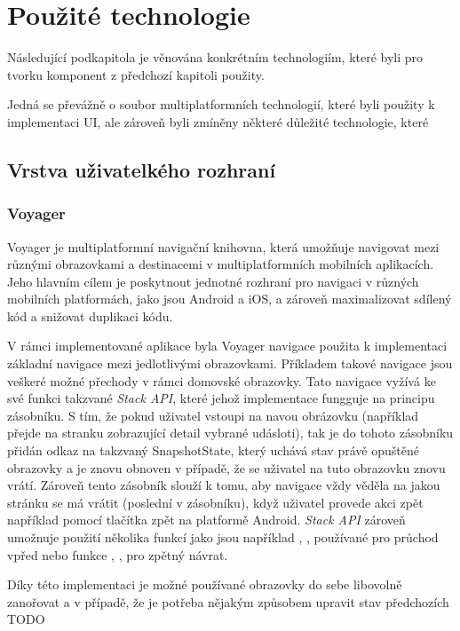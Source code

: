 \section{Použité technologie}
Následující podkapitola je věnována konkrétním technologiím, které byli pro tvorku komponent z předchozí kapitoli použity.

Jedná se převážně o soubor multiplatformních technologií, které byli použity k implementaci UI, ale zároveň byli zmíněny některé důležité technologie,
které


\subsection{Vrstva uživatelkého rozhraní}

\subsubsection*{Voyager}
Voyager je multiplatformní navigační knihovna, která umožňuje navigovat mezi různými obrazovkami a destinacemi v multiplatformních mobilních
 aplikacích. \cite{voyager} Jeho hlavním cílem je poskytnout jednotné rozhraní pro navigaci v různých mobilních platformách, jako jsou Android a iOS, a 
 zároveň maximalizovat sdílený kód a snižovat duplikaci kódu.

 V rámci implementované aplikace byla Voyager navigace použita k implementaci základní navigace mezi jedlotlivými obrazovkami.
 Příkladem takové navigace jsou veškeré možné přechody v rámci domovské obrazovky. Tato navigace vyžívá ke své funkci takzvané 
 \textit{Stack API}, které jehož implementace fungguje na principu zásobníku. S tím, že pokud uživatel vstoupi na navou obrázovku 
 (například přejde na stranku zobrazující detail vybrané udásloti), tak je do tohoto zásobníku přidán odkaz na takzvaný SnapshotState,
 který uchává stav právě opuštěné obrazovky a je znovu obnoven v případě, že se uživatel na tuto obrazovku znovu vrátí. Zároveň tento
 zásobník slouží k tomu, aby navigace vždy věděla na jakou stránku se má vrátit (poslední v zásobníku), když uživatel provede akci zpět
 například pomocí tlačítka zpět na platformě Android. \textit{Stack API} zároveň umožnuje použití několika funkcí jako jsou například 
 , ,  používané pro průchod vpřed nebo funkce , , 
  pro zpětný návrat. 

 Díky této implementaci je možné používané obrazovky do sebe libovolně zanořovat a v případě, že je potřeba nějakým způsobem upravit
 stav předchozích TODO

